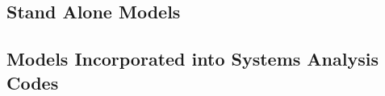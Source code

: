 



\subsection{Stand Alone Models}

\subsection{Models Incorporated into Systems Analysis Codes}


